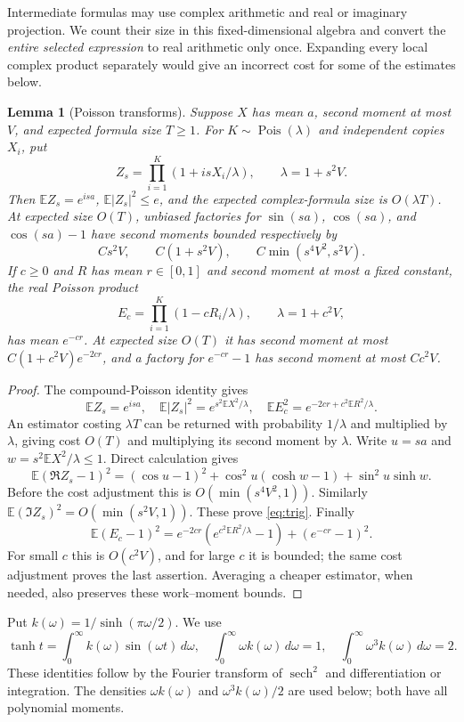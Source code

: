 \documentclass[11pt]{article}
\newtheorem{lemma}[theorem]{Lemma}
\newcommand{\E}{\mathbb E}
\begin{document}
Intermediate formulas may use complex arithmetic and real or imaginary projection. We count their size in this fixed-dimensional algebra and convert the \emph{entire selected expression} to real arithmetic only once. Expanding every local complex product separately would give an incorrect cost for some of the estimates below.

\begin{lemma}[Poisson transforms]
\label{lem:poisson}
Suppose $X$ has mean $a$, second moment at most $V$, and expected formula size $T\ge1$. For $K\sim\operatorname{Pois}(\lambda)$ and independent copies $X_i$, put
\[
 Z_s=\prod_{i=1}^K(1+isX_i/\lambda),\qquad \lambda=1+s^2V.
\]
Then $\E Z_s=e^{isa}$, $\E|Z_s|^2\le e$, and the expected complex-formula size is $O(\lambda T)$. At expected size $O(T)$, unbiased factories for $\sin(sa)$, $\cos(sa)$, and $\cos(sa)-1$ have second moments bounded respectively by
\begin{equation}
 Cs^2V,\qquad C(1+s^2V),\qquad C\min(s^4V^2,s^2V).
 \label{eq:trig}
\end{equation}
If $c\ge0$ and $R$ has mean $r\in[0,1]$ and second moment at most a fixed constant, the real Poisson product
\[
 E_c=\prod_{i=1}^K(1-cR_i/\lambda),\qquad \lambda=1+c^2V,
\]
has mean $e^{-cr}$. At expected size $O(T)$ it has second moment at most $C(1+c^2V)e^{-2cr}$, and a factory for $e^{-cr}-1$ has second moment at most $Cc^2V$.
\end{lemma}
\begin{proof}
The compound-Poisson identity gives
\[
 \E Z_s=e^{isa},\quad \E|Z_s|^2=e^{s^2\E X^2/\lambda},\quad
 \E E_c^2=e^{-2cr+c^2\E R^2/\lambda}.
\]
An estimator costing $\lambda T$ can be returned with probability $1/\lambda$ and multiplied by $\lambda$, giving cost $O(T)$ and multiplying its second moment by $\lambda$. Write $u=sa$ and $w=s^2\E X^2/\lambda\le1$. Direct calculation gives
\[
 \E(\Re Z_s-1)^2=(\cos u-1)^2+\cos^2u(\cosh w-1)+\sin^2u\sinh w.
\]
Before the cost adjustment this is $O(\min(s^4V^2,1))$. Similarly $\E(\Im Z_s)^2=O(\min(s^2V,1))$. These prove \eqref{eq:trig}. Finally
\[
 \E(E_c-1)^2=e^{-2cr}(e^{c^2\E R^2/\lambda}-1)+(e^{-cr}-1)^2.
\]
For small $c$ this is $O(c^2V)$, and for large $c$ it is bounded; the same cost adjustment proves the last assertion. Averaging a cheaper estimator, when needed, also preserves these work--moment bounds.
\end{proof}

Put $k(\omega)=1/\sinh(\pi\omega/2)$. We use
\begin{equation}
 \tanh t=\int_0^\infty k(\omega)\sin(\omega t)\,d\omega,
 \quad \int_0^\infty\omega k(\omega)\,d\omega=1,
 \quad \int_0^\infty\omega^3 k(\omega)\,d\omega=2.
 \label{eq:fourier}
\end{equation}
These identities follow by the Fourier transform of $\operatorname{sech}^2$ and differentiation or integration. The densities $\omega k(\omega)$ and $\omega^3k(\omega)/2$ are used below; both have all polynomial moments.
\end{document}
